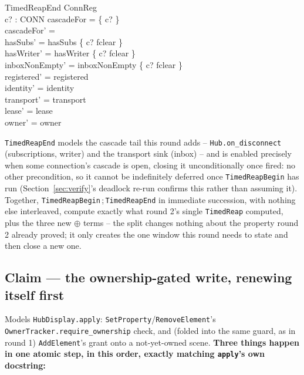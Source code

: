 \documentclass[a4paper,10pt,fleqn]{article}
\begin{document}
\begin{schema}{TimedReapEnd}
  \Delta ConnReg \\
  c? : CONN
\where
  cascadeFor = \{ c? \} \\
  cascadeFor' = \emptyset \\
  hasSubs' = hasSubs \oplus \{ c? \mapsto fclear \} \\
  hasWriter' = hasWriter \oplus \{ c? \mapsto fclear \} \\
  inboxNonEmpty' = inboxNonEmpty \oplus \{ c? \mapsto fclear \} \\
  registered' = registered \\
  identity' = identity \\
  transport' = transport \\
  lease' = lease \\
  owner' = owner
\end{schema}

\texttt{TimedReapEnd} models the cascade tail this round adds --
\texttt{Hub.on\_disconnect} (subscriptions, writer) and the transport
sink (inbox) -- and is enabled precisely when some connection's cascade is
open, closing it unconditionally once fired: no other precondition, so it
cannot be indefinitely deferred once \texttt{TimedReapBegin} has run
(Section~\ref{sec:verify}'s deadlock re-run confirms this rather than
assuming it). Together, \texttt{TimedReapBegin}\,;\,\texttt{TimedReapEnd} in
immediate succession, with nothing else interleaved, compute exactly what
round 2's single \texttt{TimedReap} computed, plus the three new
\(\oplus\) terms -- the split changes nothing about the property round 2
already proved; it only creates the one window this round needs to state
and then close a new one.

\subsection{Claim --- the ownership-gated write, renewing itself first}
\label{sec:claim}

Models \texttt{HubDisplay.apply}: \texttt{SetProperty}/\texttt{RemoveElement}'s
\texttt{OwnerTracker.require\_ownership} check, and (folded into the same
guard, as in round 1) \texttt{AddElement}'s grant onto a not-yet-owned
scene. \textbf{Three things happen in one atomic step, in this order,
exactly matching \texttt{apply}'s own docstring:}
\end{document}
